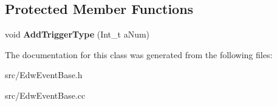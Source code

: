 \subsection*{Protected Member Functions}
\begin{DoxyCompactItemize}
\item 
\hypertarget{class_edw_event_base_ae312e3058e4c7f6e944d006055f24632}{
void {\bfseries AddTriggerType} (Int\_\-t aNum)}
\label{class_edw_event_base_ae312e3058e4c7f6e944d006055f24632}

\end{DoxyCompactItemize}


The documentation for this class was generated from the following files:\begin{DoxyCompactItemize}
\item 
src/EdwEventBase.h\item 
src/EdwEventBase.cc\end{DoxyCompactItemize}
